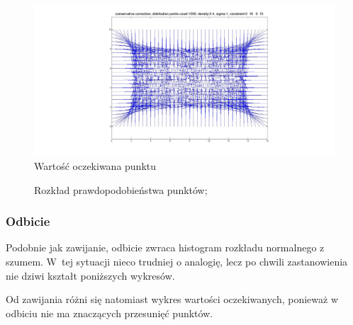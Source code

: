 \documentclass{mini}
\begin{document}
\begin{figure}[H]
\centering
\includegraphics[width=\textwidth]{wrapping2dprzesuniecie}
\caption{Wartość oczekiwana punktu}
\end{figure}

\begin{figure}[H]
\centering
{}
\quad
{}
\caption{Rozkład prawdopodobieństwa punktów;}
\end{figure}

\subsubsection*{Odbicie}
Podobnie jak zawijanie, odbicie zwraca histogram rozkładu normalnego z szumem. W~tej sytuacji nieco trudniej o analogię, lecz po chwili zastanowienia nie dziwi kształt poniższych wykresów.

Od zawijania różni się natomiast wykres wartości oczekiwanych, ponieważ w odbiciu nie ma znaczących przesunięć punktów.
\end{document}
